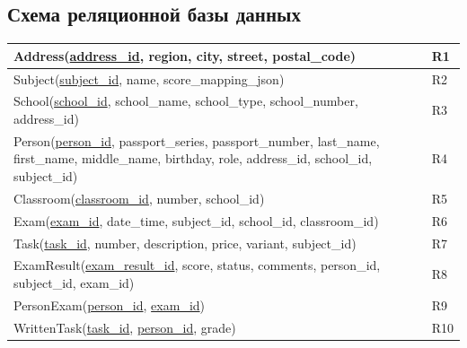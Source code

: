 \documentclass[a4paper]{article}
\begin{document}
\subsection{Схема реляционной базы данных}

\renewcommand{\arraystretch}{1.5}
\begin{tabular}{|p{10cm}|p{2cm}|}
      \hline
      Address(\underline{address\_id}, region, city, street, postal\_code)                                                                                            & R1  \\
      \hline
      Subject(\underline{subject\_id}, name, score\_mapping\_json)                                                                                                    & R2  \\
      \hline
      School(\underline{school\_id}, school\_name, school\_type, school\_number, address\_id)                                                                         & R3  \\
      \hline
      Person(\underline{person\_id}, passport\_series, passport\_number, last\_name, first\_name, middle\_name, birthday, role, address\_id, school\_id, subject\_id) & R4  \\
      \hline
      Classroom(\underline{classroom\_id}, number, school\_id)                                                                                                        & R5  \\
      \hline
      Exam(\underline{exam\_id}, date\_time, subject\_id, school\_id, classroom\_id)                                                                                  & R6  \\
      \hline
      Task(\underline{task\_id}, number, description, price, variant, subject\_id)                                                                                    & R7  \\
      \hline
      ExamResult(\underline{exam\_result\_id}, score, status, comments, person\_id, subject\_id, exam\_id)                                                            & R8  \\
      \hline
      PersonExam(\underline{person\_id}, \underline{exam\_id})                                                                                                        & R9  \\
      \hline
      WrittenTask(\underline{task\_id}, \underline{person\_id}, grade)                                                                                                & R10 \\
      \hline
\end{tabular}
\renewcommand{\arraystretch}{1}
\end{document}
